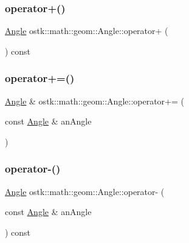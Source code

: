 \mbox{\label{classostk_1_1math_1_1geom_1_1_angle_a082673bbfc73cc1f9c6168f8013872fe}} 
\subsubsection{\texorpdfstring{operator+()}{operator+()}\hspace{0.1cm}{\footnotesize\ttfamily [2/2]}}
{\footnotesize\ttfamily \hyperlink{classostk_1_1math_1_1geom_1_1_angle}{Angle} ostk\+::math\+::geom\+::\+Angle\+::operator+ (\begin{DoxyParamCaption}{ }\end{DoxyParamCaption}) const}

\mbox{\label{classostk_1_1math_1_1geom_1_1_angle_a171c1f1f5dde76fb9b50e7f2b45cd477}} 
\subsubsection{\texorpdfstring{operator+=()}{operator+=()}}
{\footnotesize\ttfamily \hyperlink{classostk_1_1math_1_1geom_1_1_angle}{Angle} \& ostk\+::math\+::geom\+::\+Angle\+::operator+= (\begin{DoxyParamCaption}\item[{const \hyperlink{classostk_1_1math_1_1geom_1_1_angle}{Angle} \&}]{an\+Angle }\end{DoxyParamCaption})}

\mbox{\label{classostk_1_1math_1_1geom_1_1_angle_a08ceed11f370427916fa00dc2d5e5584}} 
\subsubsection{\texorpdfstring{operator-\/()}{operator-()}\hspace{0.1cm}{\footnotesize\ttfamily [1/2]}}
{\footnotesize\ttfamily \hyperlink{classostk_1_1math_1_1geom_1_1_angle}{Angle} ostk\+::math\+::geom\+::\+Angle\+::operator-\/ (\begin{DoxyParamCaption}\item[{const \hyperlink{classostk_1_1math_1_1geom_1_1_angle}{Angle} \&}]{an\+Angle }\end{DoxyParamCaption}) const}


